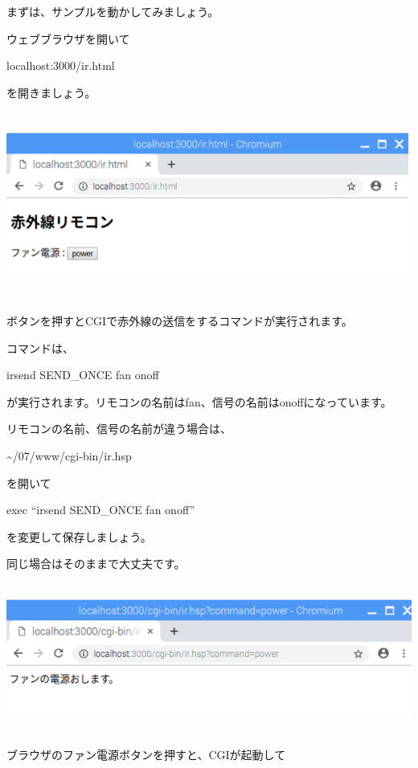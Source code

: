 \documentclass[a4paper,12pt,dvipdfmx]{jarticle}
\begin{document}
まずは、サンプルを動かしてみましょう。

ウェブブラウザを開いて

localhost:3000/ir.html

を開きましょう。

%
%


\centering
\includegraphics[width=17.006cm,height=6.142cm]{ome7-img061.png}
\flushleft

ボタンを押すとCGIで赤外線の送信をするコマンドが実行されます。

コマンドは、

irsend SEND\_ONCE fan onoff

が実行されます。リモコンの名前はfan、信号の名前はonoffになっています。

リモコンの名前、信号の名前が違う場合は、

\~{}/07/www/cgi-bin/ir.hsp

を開いて

exec “irsend SEND\_ONCE fan onoff”

を変更して保存しましょう。

同じ場合はそのままで大丈夫です。

%


\centering
\includegraphics[width=16.671cm,height=4.895cm]{ome7-img062.png}
\flushleft

ブラウザのファン電源ボタンを押すと、CGIが起動して
\end{document}
